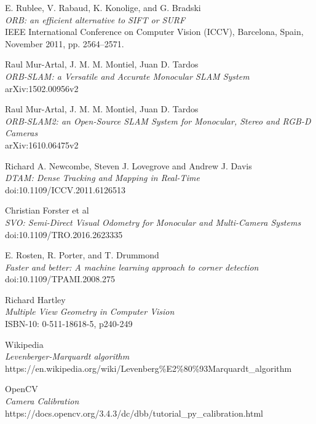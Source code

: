 \documentclass[11pt,a4paper,titlepage,oneside]{report}
\begin{document}
\begin{thebibliography}{1}

	E. Rublee, V. Rabaud, K. Konolige, and G. Bradski\\
	\textit{ORB: an efficient alternative to SIFT or SURF}\\
	IEEE International Conference on Computer Vision (ICCV), Barcelona, Spain, November 2011, pp. 2564–2571.

  Raul Mur-Artal, J. M. M. Montiel, Juan D. Tardos\\
  \textit{ORB-SLAM: a Versatile and Accurate Monocular SLAM System}\\
  arXiv:1502.00956v2

  Raul Mur-Artal, J. M. M. Montiel, Juan D. Tardos\\
  \textit{ORB-SLAM2: an Open-Source SLAM System for Monocular, Stereo and RGB-D Cameras}\\
	arXiv:1610.06475v2 

	Richard A. Newcombe, Steven J. Lovegrove and Andrew J. Davis\\
	\textit{DTAM: Dense Tracking and Mapping in Real-Time}\\
	doi:10.1109/ICCV.2011.6126513

	Christian Forster et al\\
	\textit{SVO: Semi-Direct Visual Odometry for Monocular and Multi-Camera Systems}\\
	doi:10.1109/TRO.2016.2623335

	E. Rosten, R. Porter, and T. Drummond \\
	\textit{Faster and better: A machine learning approach to corner detection}\\
	doi:10.1109/TPAMI.2008.275

	Richard Hartley\\
	\textit{Multiple View Geometry in Computer Vision}\\
	ISBN-10: 0-511-18618-5, p240-249

	Wikipedia\\
	\textit{Levenberger-Marquardt algorithm}\\
	https://en.wikipedia.org/wiki/Levenberg\%E2\%80\%93Marquardt\_algorithm

	OpenCV\\
	\textit{Camera Calibration}\\
	https://docs.opencv.org/3.4.3/dc/dbb/tutorial\_py\_calibration.html


\end{thebibliography}
\end{document}
